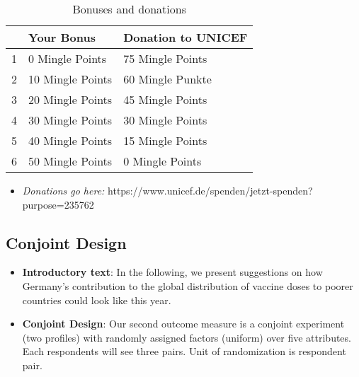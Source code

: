 \documentclass[12pt,oneside,smallheadings,chapterprefix=true]{article}
\begin{document}
\begin{longtable}[]{@{}lll@{}}
\caption{Bonuses and donations}
\label{table:mingle}
\endfirsthead
\endhead
\toprule
& Your Bonus & Donation to UNICEF\tabularnewline
\midrule
\endhead
1 & 0 Mingle Points & 75 Mingle Points\tabularnewline
2 & 10 Mingle Points & 60 Mingle Punkte\tabularnewline
3 & 20 Mingle Points & 45 Mingle Points\tabularnewline
4 & 30 Mingle Points & 30 Mingle Points\tabularnewline
5 & 40 Mingle Points & 15 Mingle Points\tabularnewline
6 & 50 Mingle Points & 0 Mingle Points\tabularnewline
\bottomrule
\end{longtable}


\begin{itemize}
\tightlist
\item
  \emph{Donations go here:}
  https://www.unicef.de/spenden/jetzt-spenden?purpose=235762
\end{itemize}

    \hypertarget{conjoint-design}{%
\subsection{Conjoint Design}\label{conjoint-design}}

\begin{itemize}
\tightlist
\item
  \textbf{Introductory text}: In the following, we present suggestions
  on how Germany's contribution to the global distribution of vaccine
  doses to poorer countries could look like this year.
\item
  \textbf{Conjoint Design}: Our second outcome measure is a conjoint experiment (two profiles) with randomly assigned factors (uniform) over five attributes. Each respondents will see three pairs. Unit of randomization is respondent pair.
\end{itemize}
\end{document}
